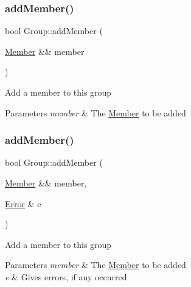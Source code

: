 \subsubsection{\texorpdfstring{add\+Member()}{addMember()}\hspace{0.1cm}{\footnotesize\ttfamily [1/2]}}
{\footnotesize\ttfamily bool Group\+::add\+Member (\begin{DoxyParamCaption}\item[{\hyperlink{classshaan97_1_1sync_1_1_member}{Member} \&\&}]{member }\end{DoxyParamCaption})}

Add a member to this group


\begin{DoxyParams}{Parameters}
{\em member} & The \hyperlink{classshaan97_1_1sync_1_1_member}{Member} to be added \\
\hline
\end{DoxyParams}
\mbox{\label{classshaan97_1_1sync_1_1_group_ac780b07e1058acd909c0ffc3b8008da8}} 
\subsubsection{\texorpdfstring{add\+Member()}{addMember()}\hspace{0.1cm}{\footnotesize\ttfamily [2/2]}}
{\footnotesize\ttfamily bool Group\+::add\+Member (\begin{DoxyParamCaption}\item[{\hyperlink{classshaan97_1_1sync_1_1_member}{Member} \&\&}]{member,  }\item[{\hyperlink{classshaan97_1_1sync_1_1_error}{Error} \&}]{e }\end{DoxyParamCaption})}





Add a member to this group


\begin{DoxyParams}{Parameters}
{\em member} & The \hyperlink{classshaan97_1_1sync_1_1_member}{Member} to be added \\
\hline
{\em e} & Gives errors, if any occurred \\
\hline
\end{DoxyParams}
\mbox{\label{classshaan97_1_1sync_1_1_group_a16ad0f69a940568e36caad49b6401ae4}} 
